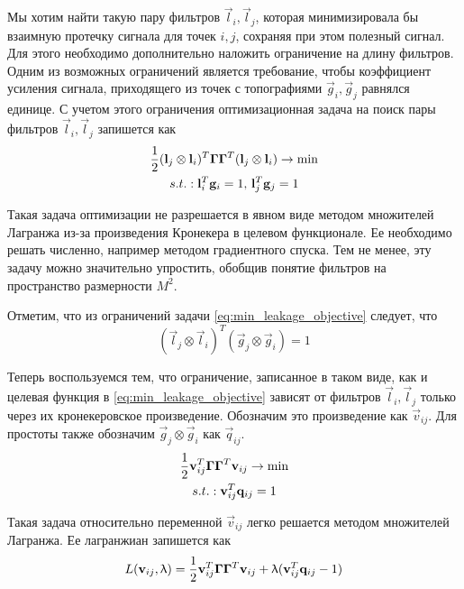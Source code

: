 Мы хотим найти такую пару фильтров $\vec{l}_i, \vec{l}_j$, которая
минимизировала бы взаимную протечку сигнала для точек $i, j$, сохраняя при этом
полезный сигнал. Для этого необходимо дополнительно наложить ограничение на
длину фильтров. Одним из возможных ограничений является требование, чтобы
коэффициент усиления сигнала, приходящего из точек с топографиями $\vec{g}_i,
\vec{g}_j$ равнялся единице. С учетом этого ограничения оптимизационная задача
на поиск пары фильтров $\vec{l}_i, \vec{l}_j$ запишется как
\begin{gather}
    \frac{1}{2} (\mathbf{l}_j \otimes \mathbf{l}_i)^T \mathbf{\Gamma} \mathbf{\Gamma}^T(\mathbf{l}_j \otimes \mathbf{l}_i) \rightarrow \min\\
    s.t.: \mathbf{l}_i^T \mathbf{g}_i = 1, \, \mathbf{l}_j^T \mathbf{g}_j = 1
    \label{eq:min_leakage_objective}
\end{gather}

Такая задача оптимизации не разрешается в явном виде методом множителей
Лагранжа из-за произведения Кронекера в целевом функционале. Ее необходимо
решать численно, например методом градиентного спуска. Тем не менее, эту задачу
можно значительно упростить, обобщив понятие фильтров на пространство размерности $M^2$.

Отметим, что из ограничений задачи \ref{eq:min_leakage_objective} следует, что
\begin{equation}
    (\vec{l}_j \otimes \vec{l}_i)^T (\vec{g}_j \otimes \vec{g}_i) = 1
    \label{eq:min_leakage_restriction_kron}
\end{equation}

Теперь воспользуемся тем, что ограничение, записанное в таком виде, как и
целевая функция в \ref{eq:min_leakage_objective} зависят от фильтров
$\vec{l}_i, \vec{l}_j$ только через их кронекеровское произведение.
Обозначим это произведение как $\vec{v}_{ij}$.
Для простоты также обозначим $\vec{g}_j \otimes \vec{g}_i$ как $\vec{q}_{ij}$.
\begin{gather}
    \frac{1}{2} \mathbf{v}_{ij}^T \mathbf{\Gamma} \mathbf{\Gamma}^T\mathbf{v}_{ij} \rightarrow \min\\
    s.t.: \mathbf{v}_{ij}^T \mathbf{q}_{ij} = 1
    \label{eq:min_leakage_objective_kron}
\end{gather}

Такая задача относительно переменной $\vec{v}_{ij}$ легко решается методом множителей Лагранжа.
Ее лагранжиан запишется как
\begin{equation}
    L(\mathbf{v}_{ij}, \uplambda) = \frac{1}{2} \mathbf{v}_{ij}^T \mathbf{\Gamma} \mathbf{\Gamma}^T\mathbf{v}_{ij} + \uplambda (\mathbf{v}_{ij}^T \mathbf{q}_{ij} - 1)
    \label{eq:min_leakage_lagrangian}
\end{equation}

